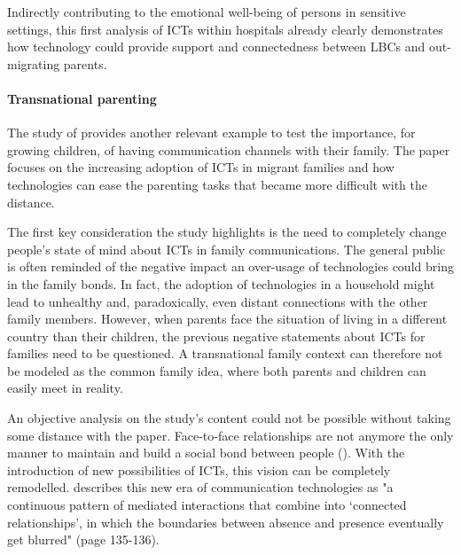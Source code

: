 Indirectly contributing to the emotional well-being of persons in sensitive settings, this first analysis of ICTs within hospitals already clearly demonstrates how technology could provide support and connectedness between LBCs and out-migrating parents. 

\vspace{4pt}
\paragraph{Transnational parenting}
The study of \textcite{bacigalupe2011virtualizing} provides another relevant example to test the importance, for growing children, of having communication channels with their family. The paper focuses on the increasing adoption of ICTs in migrant families and how technologies can ease the parenting tasks that became more difficult with the distance. 

The first key consideration the study highlights is the need to completely change people's state of mind about ICTs in family communications. The general public is often reminded of the negative impact an over-usage of technologies could bring in the family bonds. In fact, the adoption of technologies in a household might lead to unhealthy and, paradoxically, even distant connections with the other family members. However, when parents face the situation of living in a different country than their children, the previous negative statements about ICTs for families need to be questioned. A transnational family context can therefore not be modeled as the common family idea, where both parents and children can easily meet in reality.

An objective analysis on the study's content could not be possible without taking some distance with the paper. Face-to-face relationships are not anymore the only manner to maintain and build a social bond between people (\cite{bacigalupe2011virtualizing}). With the introduction of new possibilities of ICTs, this vision can be completely remodelled. \textcite{licoppe2004connected} describes this new era of communication technologies as "a continuous pattern of mediated interactions that combine into `connected relationships', in which the boundaries between absence and presence eventually get blurred" (page 135-136).

